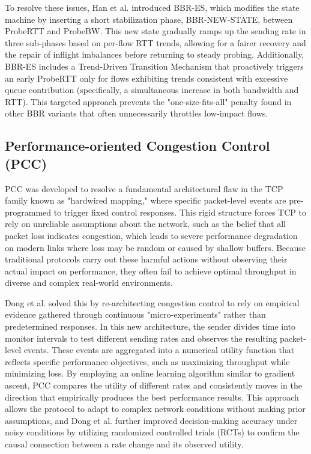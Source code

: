 To resolve these issues, Han et al. introduced BBR-ES, which modifies the state machine by inserting a short stabilization phase, BBR-NEW-STATE, between ProbeRTT and ProbeBW. 
This new state gradually ramps up the sending rate in three sub-phases based on per-flow RTT trends, allowing for a fairer recovery and the repair of inflight imbalances before returning to steady probing. 
Additionally, BBR-ES includes a Trend-Driven Transition Mechanism that proactively triggers an early ProbeRTT only for flows exhibiting trends consistent with excessive queue contribution (specifically, a simultaneous increase in both bandwidth and RTT). 
This targeted approach prevents the "one-size-fits-all" penalty found in other BBR variants that often unnecessarily throttles low-impact flows.

\subsection{Performance-oriented Congestion Control (PCC)}

PCC was developed to resolve a fundamental architectural flaw in the TCP family known as "hardwired mapping," where specific packet-level events are pre-programmed to trigger fixed control responses\cite{PCC}. 
This rigid structure forces TCP to rely on unreliable assumptions about the network, such as the belief that all packet loss indicates congestion, which leads to severe performance degradation on modern links where loss may be random or caused by shallow buffers.
Because traditional protocols carry out these harmful actions without observing their actual impact on performance, they often fail to achieve optimal throughput in diverse and complex real-world environments.

Dong et al. solved this by re-architecting congestion control to rely on empirical evidence gathered through continuous "micro-experiments" rather than predetermined responses. 
In this new architecture, the sender divides time into monitor intervals to test different sending rates and observes the resulting packet-level events. 
These events are aggregated into a numerical utility function that reflects specific performance objectives, such as maximizing throughput while minimizing loss. By employing an online learning algorithm similar to gradient ascent, PCC compares the utility of different rates and consistently moves in the direction that empirically produces the best performance results. 
This approach allows the protocol to adapt to complex network conditions without making prior assumptions, and Dong et al. further improved decision-making accuracy under noisy conditions by utilizing randomized controlled trials (RCTs) to confirm the causal connection between a rate change and its observed utility.

